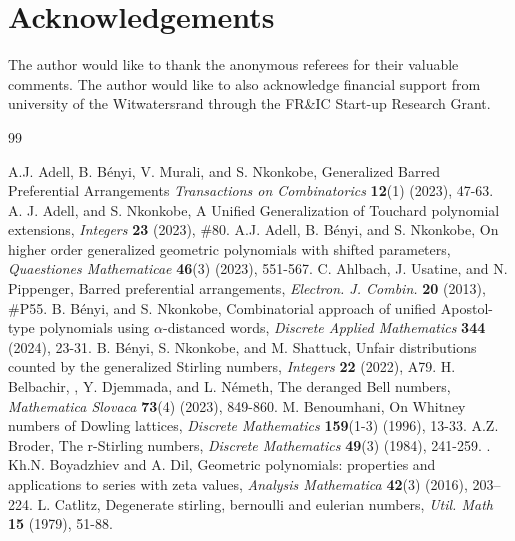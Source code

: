 \documentclass[12pt]{amsart}
\newtheorem{proof 1}{proof 1}
\begin{document}
\section{Acknowledgements} The author would like to thank the anonymous referees for their valuable comments. The author would like to also acknowledge financial support from university of the Witwatersrand through the FR\&IC Start-up Research Grant.



{}


\iffalse

 \begin{thebibliography}{99}
 
  A.J. Adell, B. Bényi, V. Murali, and S. Nkonkobe, {Generalized Barred Preferential Arrangements} \textit{Transactions on Combinatorics} \textbf{12}(1) (2023), 47-63.
 	 A. J. Adell, and S. Nkonkobe, {A Unified Generalization of Touchard polynomial extensions}, \textit{Integers} \textbf{23} (2023), \#80.
  A.J. Adell, B. Bényi, and S. Nkonkobe, On higher order generalized geometric polynomials with shifted parameters, \textit{Quaestiones Mathematicae} \textbf{46}(3) (2023), 551-567.
 	 C. Ahlbach, J. Usatine,  and N. Pippenger, Barred preferential arrangements,
 	\textit{Electron. J. Combin.} {\bf20} (2013),  \#P55.
 	B. Bényi, and S. Nkonkobe, Combinatorial approach of unified Apostol-type polynomials using $\alpha$-distanced words, \textit{Discrete Applied Mathematics} \textbf{344} (2024), 23-31.
 	B. Bényi, S. Nkonkobe, and M. Shattuck, Unfair distributions counted by the generalized Stirling numbers, \textit{Integers} \textbf{22} (2022), A79.
 	H. Belbachir, , Y. Djemmada, and L. Németh, The deranged Bell numbers, \textit{Mathematica Slovaca} \textbf{73}(4) (2023), 849-860.
 	M. Benoumhani, On Whitney numbers of Dowling lattices, \textit{Discrete Mathematics} \textbf{159}(1-3) (1996), 13-33.
 	A.Z. Broder, The r-Stirling numbers, \textit{Discrete Mathematics}  \textbf{49}(3)  (1984), 241-259.
 	. Kh.N. Boyadzhiev and A. Dil, Geometric polynomials: properties and applications
 	to series with zeta values, \textit{Analysis Mathematica} \textbf{42}(3) (2016), 203–224.
 	L. Catlitz, Degenerate stirling, bernoulli and eulerian numbers, \textit{Util. Math} \textbf{15} (1979), 51-88.

\end{thebibliography}
\end{document}
